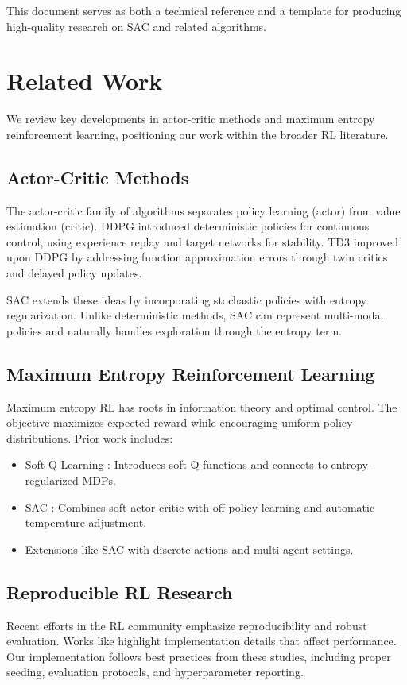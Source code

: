 \documentclass[conference]{IEEEtran}
\begin{document}
This document serves as both a technical reference and a template for producing high-quality research on SAC and related algorithms.

\section{Related Work}
We review key developments in actor-critic methods and maximum entropy reinforcement learning, positioning our work within the broader RL literature.

\subsection{Actor-Critic Methods}
The actor-critic family of algorithms separates policy learning (actor) from value estimation (critic). DDPG \citep{lillicrap2015continuous} introduced deterministic policies for continuous control, using experience replay and target networks for stability. TD3 \citep{fujimoto2018addressing} improved upon DDPG by addressing function approximation errors through twin critics and delayed policy updates.

SAC extends these ideas by incorporating stochastic policies with entropy regularization. Unlike deterministic methods, SAC can represent multi-modal policies and naturally handles exploration through the entropy term.

\subsection{Maximum Entropy Reinforcement Learning}
Maximum entropy RL has roots in information theory and optimal control. The objective maximizes expected reward while encouraging uniform policy distributions. Prior work includes:
\begin{itemize}
  \item Soft Q-Learning \citep{haarnoja2017reinforcement}: Introduces soft Q-functions and connects to entropy-regularized MDPs.
  \item SAC \citep{haarnoja2018soft}: Combines soft actor-critic with off-policy learning and automatic temperature adjustment.
  \item Extensions like SAC with discrete actions \citep{haarnoja2018softdiscrete} and multi-agent settings.
\end{itemize}

\subsection{Reproducible RL Research}
Recent efforts in the RL community emphasize reproducibility and robust evaluation. Works like \citep{engstrom2019implementation} highlight implementation details that affect performance. Our implementation follows best practices from these studies, including proper seeding, evaluation protocols, and hyperparameter reporting.
\end{document}
